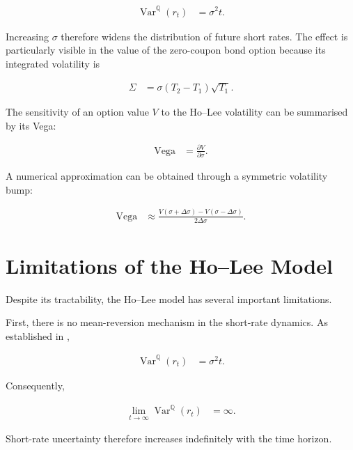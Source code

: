 \documentclass[11pt,a4paper]{article}
\newcommand{\Q}{\mathbb{Q}}
\newcommand{\Var}{\operatorname{Var}}
\numberwithin{equation}{section}
\begin{document}
\begin{align*}
    \Var^{\Q}(r_t)
    &=
    \sigma^2t.
\end{align*}

Increasing $\sigma$ therefore widens the distribution of future short
rates. The effect is particularly visible in the value of the
zero-coupon bond option because its integrated volatility is

\begin{align*}
    \Sigma
    &=
    \sigma(T_2-T_1)\sqrt{T_1}.
\end{align*}

The sensitivity of an option value $V$ to the Ho--Lee volatility can be
summarised by its Vega:

\begin{align*}
    \mathrm{Vega}
    &=
    \frac{\partial V}{\partial\sigma}.
\end{align*}

A numerical approximation can be obtained through a symmetric volatility
bump:

\begin{align*}
    \mathrm{Vega}
    &\approx
    \frac{
        V(\sigma+\Delta\sigma)
        -
        V(\sigma-\Delta\sigma)
    }{
        2\Delta\sigma
    }.
\end{align*}


\section{Limitations of the Ho--Lee Model}

Despite its tractability, the Ho--Lee model has several important
limitations.

First, there is no mean-reversion mechanism in the short-rate dynamics.
As established in ,

\begin{align*}
    \Var^{\Q}(r_t)
    &=
    \sigma^2t.
\end{align*}

Consequently,

\begin{align*}
    \lim_{t\rightarrow\infty}
    \Var^{\Q}(r_t)
    &=
    \infty.
\end{align*}

Short-rate uncertainty therefore increases indefinitely with the time
horizon.
\end{document}
